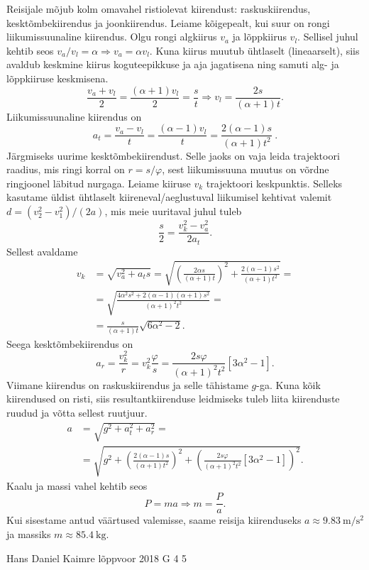 \documentclass[11pt, twoside]{article}
\begin{document}
{{\ifSolution
Reisijale mõjub kolm omavahel ristiolevat kiirendust: raskuskiirendus, kesktõmbekiirendus ja joonkiirendus. Leiame kõigepealt, kui suur on rongi liikumissuunaline kiirendus. Olgu rongi algkiirus $v_a$ ja lõppkiirus $v_l$. Sellisel juhul kehtib seos $v_a/v_l=\alpha \Rightarrow v_a = \alpha v_l$. Kuna kiirus muutub ühtlaselt (lineaarselt), siis avaldub keskmine kiirus koguteepikkuse ja aja jagatisena ning samuti alg- ja lõppkiiruse keskmisena.
\[ \frac{v_a + v_l}{2} = \frac{(\alpha + 1) v_l}{2} = \frac{s}{t} \Rightarrow v_l = \frac{2s}{(\alpha + 1)t}. \]
Liikumissuunaline kiirendus on
\[ a_t = \frac{v_a-v_l}{t} = \frac{(\alpha - 1) v_l}{t} = \frac{2(\alpha - 1)s}{(\alpha + 1)t^2} \ . \]
Järgmiseks uurime kesktõmbekiirendust. Selle jaoks on vaja leida trajektoori raadius, mis ringi korral on $r = s/\varphi$, sest liikumissuuna muutus on võrdne ringjoonel läbitud nurgaga. Leiame kiiruse $v_k$ trajektoori keskpunktis. Selleks kasutame üldist ühtlaselt kiireneval/aeglustuval liikumisel kehtivat valemit $d=(v_2^2-v_1^2)/(2a)$, mis meie uuritaval juhul tuleb
\[\frac{s}{2} = \frac{v_k^2 - v_a^2}{2a_t}.\]
Sellest avaldame
\begin{align*}
v_k &= \sqrt{v_a^2+a_t s} = \sqrt{\left(\frac{2\alpha s}{(\alpha+1)t}\right)^2 +\frac{2(\alpha - 1)s^2}{(\alpha+1)t^2}} =\\
&=\sqrt{\frac{4\alpha^2 s^2 + 2(\alpha-1)(\alpha+1)s^2}{(\alpha+1)^2 t^2}} =\\
&=\frac{s}{(\alpha+1)t} \sqrt{6\alpha^2-2}.
\end{align*}
Seega kesktõmbekiirendus on
\[ a_r = \frac{v_k^2}{r} = v_k^2 \frac{\varphi}{s} = \frac{2s\varphi}{(\alpha+1)^2t^2} [3\alpha^2-1]. \]
Viimane kiirendus on raskuskiirendus ja selle tähistame $g$-ga. Kuna kõik kiirendused on risti, siis resultantkiirenduse leidmiseks tuleb liita kiirenduste ruudud ja võtta sellest ruutjuur.
\begin{align*}
a &= \sqrt{ g^2 + a_t^2 + a_r^2 } =\\
&= \sqrt{ g^2 + \left(\frac{2(\alpha - 1)s}{(\alpha + 1)t^2}\right)^2 + \left(\frac{2s\varphi}{(\alpha+1)^2t^2} [3\alpha^2-1]\right)^2 }.
\end{align*}
Kaalu ja massi vahel kehtib seos
\[ P = ma \Rightarrow m = \frac{P}{a}. \]
Kui sisestame antud väärtused valemisse, saame reisija kiirenduseks $a\approx\SI{9.83}{\meter\per\second\squared}$ ja massiks $m\approx\SI{85.4}{\kilogram}$.
\fi
}

{Hans Daniel Kaimre} %
{lõppvoor} %
{2018} %
{G 4} %
{5} %
{

}}
\end{document}
